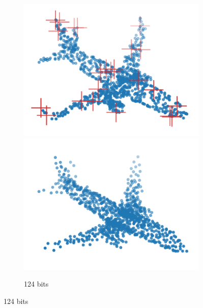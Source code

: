 \begin{figure}[t]
\begin{subfigure}[b]{\subfigureouterhspace}
\begin{subsubfigure}[b]{\subfigurehspace}
      \centering
      \includegraphics[width=\linewidth]{img/point_cloud_compression/crit/test_airplane_0630/lite_4.pdf}
      \includegraphics[width=\linewidth]{img/point_cloud_compression/rec/test_airplane_0630/lite_4.pdf}
      \caption{124 bits}
      \label{fig:rec/lite/4}
    \end{subsubfigure}%
    \hfill%
    \begin{subsubfigure}[b]{\subfigurehspace}
      \centering

\end{subsubfigure}
\end{subfigure}
\end{figure}
